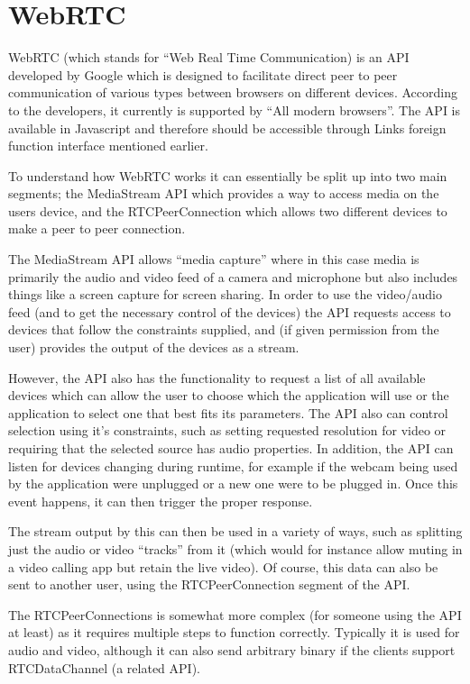 \documentclass[bsc,frontabs,singlespacing,parskip,deptreport]{infthesis}
\begin{document}
\section{WebRTC}

WebRTC (which stands for “Web Real Time Communication) is an API developed by Google which is designed to facilitate direct peer to peer communication of various types between browsers on different devices.  According to the developers, it currently is supported by “All modern browsers”.  The API is available in Javascript and therefore should be accessible through Links foreign function interface mentioned earlier.

To understand how WebRTC works it can essentially be split up into two main segments; the MediaStream API which provides a way to access media on the users device, and the RTCPeerConnection which allows two different devices to make a peer to peer connection.

The MediaStream API allows “media capture” where in this case media is primarily the audio and video feed of a camera and microphone but also includes things like a screen capture for screen sharing.  In order to use the video/audio feed (and to get the necessary control of the devices) the API requests access to devices that follow the constraints supplied, and (if given permission from the user) provides the output of the devices as a stream.

However, the API also has the functionality to request a list of all available devices which can allow the user to choose which the application will use or the application to select one that best fits its parameters.  The API also can control selection using it’s constraints, such as setting requested resolution for video or requiring that the selected source has audio properties. In addition, the API can listen for devices changing during runtime, for example if the webcam being used by the application were unplugged or a new one were to be plugged in.  Once this event happens, it can then trigger the proper response.

The stream output by this can then be used in a variety of ways, such as splitting just the audio or video “tracks” from it (which would for instance allow muting in a video calling app but retain the live video).  Of course, this data can also be sent to another user, using the RTCPeerConnection segment of the API.

The RTCPeerConnections is somewhat more complex (for someone using the API at least) as it requires multiple steps to function correctly.  Typically it is used for audio and video, although it can also send arbitrary binary if the clients support RTCDataChannel (a related API).
\end{document}
